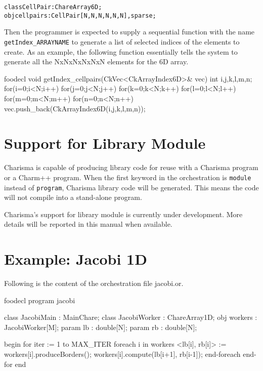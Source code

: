 \documentclass[10pt]{article}
\def\smallfbox#1{{\small {\fbox{#1}}}}
\def\code#1{{\small {\tt {#1}}}}
\begin{document}
\begin{alltt}
    class CellPair : ChareArray6D;	
    obj cellpairs : CellPair[N,N,N,N,N,N],sparse; 
\end{alltt}

Then the programmer is expected to supply a sequential function with the name
\code{getIndex\_ARRAYNAME} to generate a list of selected indices of the
elements to create. As an example, the following function essentially tells the
system to generate all the NxNxNxNxNxN elements for the 6D array. 

\begin{SaveVerbatim}{foodecl}
void getIndex_cellpairs(CkVec<CkArrayIndex6D>& vec){
  int i,j,k,l,m,n;
  for(i=0;i<N;i++)
    for(j=0;j<N;j++)
      for(k=0;k<N;k++)
        for(l=0;l<N;l++)
          for(m=0;m<N;m++)
            for(n=0;n<N;n++)
              vec.push_back(CkArrayIndex6D(i,j,k,l,m,n));
}
\end{SaveVerbatim}
\vspace{0.1in}
\smallfbox{\BUseVerbatim{foodecl}}
\vspace{0.1in}


\section{Support for Library Module}
\label{sec:module}

Charisma is capable of producing library code for reuse with a Charisma program
or a Charm++ program. When the first keyword in the orchestration is
\code{module} instead of \code{program}, Charisma library code will be
generated. This means the code will not compile into a stand-alone program.

Charisma's support for library module is currently under development. More
details will be reported in this manual when available.

\appendix
\label{sec:appendix}

\section{Example: Jacobi 1D}
Following is the content of the orchestration file jacobi.or. 

\begin{SaveVerbatim}{foodecl}
program jacobi

class  JacobiMain : MainChare;
class  JacobiWorker : ChareArray1D;
obj  workers : JacobiWorker[M];
param  lb : double[N];
param  rb : double[N];

begin
    for iter := 1 to MAX_ITER
	foreach i in workers
	    <lb[i], rb[i]> := workers[i].produceBorders();
	    workers[i].compute(lb[i+1], rb[i-1]);
	end-foreach
    end-for
end
\end{SaveVerbatim}
\vspace{0.1in}
\smallfbox{\BUseVerbatim{foodecl}}
\vspace{0.1in}
\end{document}
